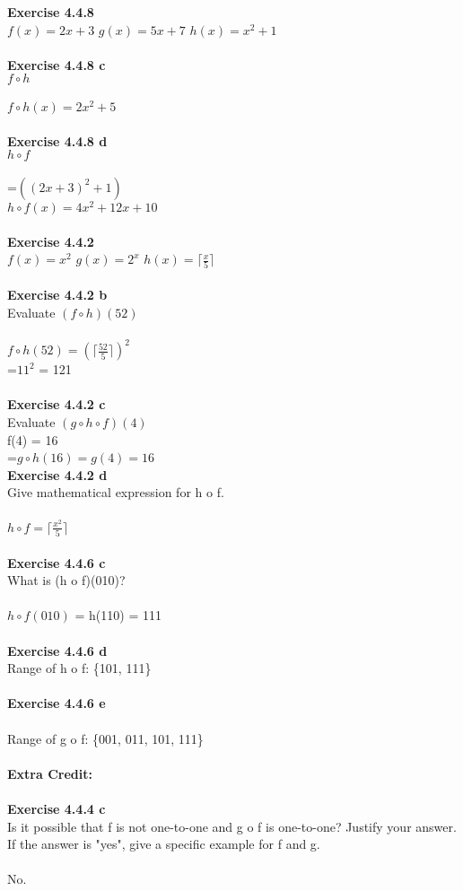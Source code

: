 \documentclass[11pt]{article}
\begin{document}
\noindent\textbf{Exercise 4.4.8}\\
$f(x) = 2x + 3$ $g(x) = 5x + 7$ $h(x) = x^2 + 1$ \\\\
\textbf{Exercise 4.4.8 c}\\
$f \circ h$ \\\\
$f \circ h(x) = 2x^2 + 5$\\\\
\textbf{Exercise 4.4.8 d}\\
$h \circ f$ \\\\
=$((2x + 3)^2 + 1)$\\
$h \circ f(x) = 4x^2 + 12x + 10$ \\\\
\textbf{Exercise 4.4.2}\\
$f(x) = x^2$ $g(x) = 2^x$ $h(x) = \lceil \frac{x}{5} \rceil$\\\\
\textbf{Exercise 4.4.2 b}\\
Evaluate $(f \circ h)(52)$\\\\
$f \circ h(52) = (\lceil \frac{52}{5} \rceil)^2  $\\
=$11^2$ = 121\\\\
\textbf{Exercise 4.4.2 c}\\
Evaluate $(g \circ h \circ f)(4)$\\
f(4) = 16\\
=$g \circ h(16) = g(4) = 16$ \\
\textbf{Exercise 4.4.2 d}\\
Give mathematical expression for h o f.\\\\
$h \circ f = \lceil \frac{x^2}{5} \rceil$\\\\
\textbf{Exercise 4.4.6 c}\\
What is (h o f)(010)?\\\\
$h \circ f(010)$ = h(110) = 111\\\\
\textbf{Exercise 4.4.6 d}\\
Range of h o f: \{101, 111\}\\\\
\textbf{Exercise 4.4.6 e}\\\\
Range of g o f: \{001, 011, 101, 111\} \\\\
\newpage
\noindent \textbf{Extra Credit:}\\\\
\textbf{Exercise 4.4.4 c}\\
Is it possible that f is not one-to-one and g o f is one-to-one? Justify your answer. If the answer is "yes", give a specific example for f and g. \\\\
No.
\end{document}
